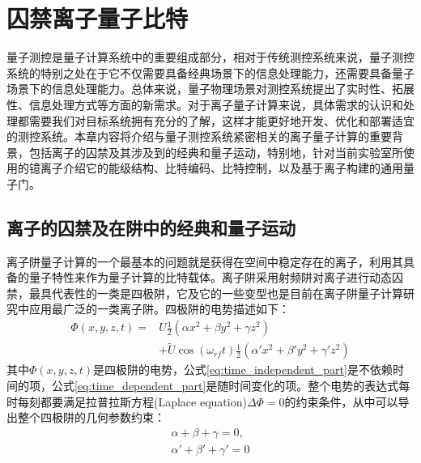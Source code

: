 
\chapter[囚禁离子量子比特]{囚禁离子量子比特\label{section:quantum_computation}}
量子测控是量子计算系统中的重要组成部分，相对于传统测控系统来说，量子测控系统的特别之处在于它不仅需要具备经典场景下的信息处理能力，还需要具备量子场景下的信息处理能力。总体来说，量子物理场景对测控系统提出了实时性、拓展性、信息处理方式等方面的新需求。对于离子量子计算来说，具体需求的认识和处理都需要我们对目标系统拥有充分的了解，这样才能更好地开发、优化和部署适宜的测控系统。本章内容将介绍与量子测控系统紧密相关的离子量子计算的重要背景，包括离子的囚禁及其涉及到的经典和量子运动，特别地，针对当前实验室所使用的镱离子介绍它的能级结构、比特编码、比特控制，以及基于离子构建的通用量子门。


\section[离子的囚禁及在阱中的经典和量子运动]{离子的囚禁及在阱中的经典和量子运动\label{section:ion_trap_motion}}
离子阱量子计算的一个最基本的问题就是获得在空间中稳定存在的离子，利用其具备的量子特性来作为量子计算的比特载体。离子阱采用射频阱对离子进行动态囚禁，最具代表性的一类是四极阱，它及它的一些变型也是目前在离子阱量子计算研究中应用最广泛的一类离子阱。四极阱的电势描述如下：
\begin{align}
    \Phi(x, y, z, t) = &U\frac{1}{2}(\alpha x^2 + \beta y^2 + \gamma z^2) \label{eq:time_independent_part}\\
    \label{eq:time_dependent_part}
    &+ \tilde{U}\cos (\omega_{rf}t)\frac{1}{2}(\alpha ' x^2 + \beta ' y^2 + \gamma ' z^2) 
\end{align}
其中$\Phi(x, y, z, t)$是四极阱的电势，公式\eqref{eq:time_independent_part}是不依赖时间的项，公式\eqref{eq:time_dependent_part}是随时间变化的项。整个电势的表达式每时每刻都要满足拉普拉斯方程(Laplace equation)$\Delta \Phi=0$的约束条件，从中可以导出整个四极阱的几何参数约束：
\begin{align}
    \alpha + \beta + \gamma =0,\\
    \alpha ' + \beta ' + \gamma ' =0
\end{align}

